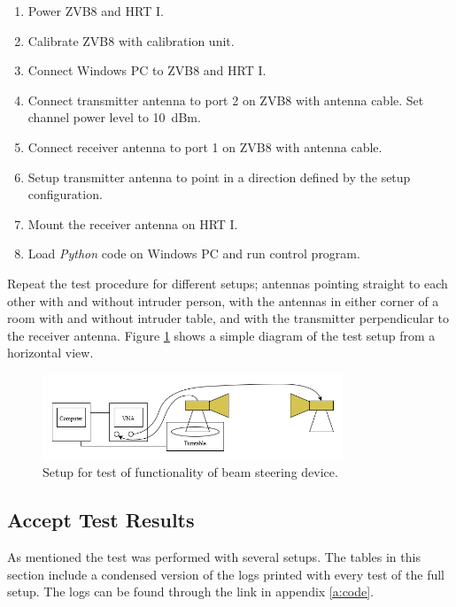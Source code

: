 \begin{enumerate}
    \item Power ZVB8 and HRT I. 
    \item Calibrate ZVB8 with calibration unit.
    \item Connect Windows PC to ZVB8 and HRT I.
    \item Connect transmitter antenna to port 2 on ZVB8 with antenna cable. Set channel power level to \SI{10}{dBm}.
    \item Connect receiver antenna to port 1 on ZVB8 with antenna cable.
    \item Setup transmitter antenna to point in a direction defined by the setup configuration. 
    \item Mount the receiver antenna on HRT I.
    \item Load \textit{Python} code on Windows PC and run control program.
\end{enumerate}

Repeat the test procedure for different setups; antennas pointing straight to each other with and without intruder person, with the antennas in either corner of a room with and without intruder table, and with the transmitter perpendicular to the receiver antenna. Figure \ref{fig:experiment-setup} shows a simple diagram of the test setup from a horizontal view.

\begin{figure}[H]
    \centering
    \includegraphics[width=0.8\textwidth]{figures/accept_test_setup.png}
    \caption{Setup for test of functionality of beam steering device.} \label{fig:experiment-setup}
\end{figure}

\subsection{Accept Test Results}
As mentioned the test was performed with several setups. The tables in this section include a condensed version of the logs printed with every test of the full setup. The logs can be found through the link in appendix \ref{a:code}. 

